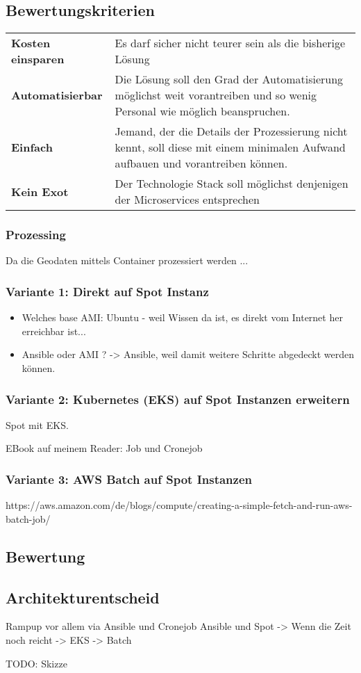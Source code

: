 \subsection{Bewertungskriterien}
\begin{tabular}{ll}
    \textbf{Kosten einsparen} & Es darf sicher nicht teurer sein als die bisherige Lösung\\
    \textbf{Automatisierbar} & Die Lösung soll den Grad der Automatisierung möglichst weit vorantreiben und so wenig Personal wie möglich beanspruchen.\\
    \textbf{Einfach} & Jemand, der die Details der Prozessierung nicht kennt, soll diese mit einem minimalen
    Aufwand aufbauen und vorantreiben können.\\
    \textbf{Kein Exot} & Der Technologie Stack soll möglichst denjenigen der Microservices entsprechen\\
\end{tabular}


\subsubsection{Prozessing}
Da die Geodaten mittels Container prozessiert werden ... 

\subsubsection{Variante 1: Direkt auf Spot Instanz}
\begin{itemize}
\item Welches base AMI: Ubuntu - weil Wissen da ist, es direkt vom Internet her erreichbar ist...
\item Ansible oder AMI ? -> Ansible, weil damit weitere Schritte abgedeckt werden können.
\end{itemize}




\subsubsection{Variante 2: Kubernetes (EKS) auf Spot Instanzen erweitern}
Spot mit EKS. 

EBook auf meinem Reader: Job und Cronejob

\subsubsection{Variante 3: AWS Batch auf Spot Instanzen}

https://aws.amazon.com/de/blogs/compute/creating-a-simple-fetch-and-run-aws-batch-job/


\subsection{Bewertung}

\subsection{Architekturentscheid}
Rampup vor allem via Ansible und Cronejob
Ansible und Spot -> Wenn die Zeit noch reicht -> EKS -> Batch

TODO: Skizze

